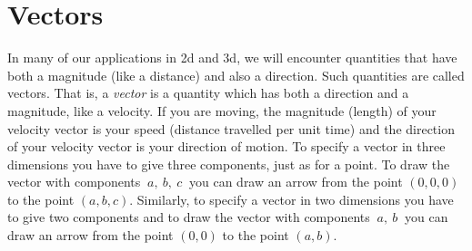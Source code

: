 \section{Vectors}\label{sec vectors}
In many of our applications in 2d and 3d, we will encounter quantities
that have both a magnitude (like a distance) and also a 
direction. Such quantities are called vectors. That is,
a \emph{vector} is a quantity which has both a direction and a magnitude,
like a velocity. If you are moving, the magnitude (length) of your 
velocity vector is your speed (distance travelled per unit time)  and the
direction of your velocity vector is your direction of motion. To specify 
a vector in three dimensions you have to give three components, just as for 
a point. To draw the vector with components $\ a,\ b,\ c\ $ you can draw 
an arrow from the point $(0,0,0)$ to the point $(a,b,c)$. 
%
Similarly, to specify a vector in two dimensions
you have to give two components and to draw the vector
with components $\ a,\ b\ $ you can draw an arrow from the point $(0,0)$
to the point $(a,b)$.

